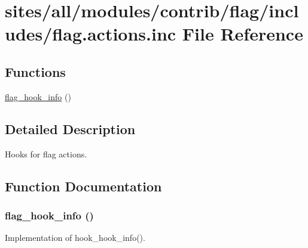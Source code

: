 \hypertarget{flag_8actions_8inc}{
\section{sites/all/modules/contrib/flag/includes/flag.actions.inc File Reference}
\label{flag_8actions_8inc}
}
\subsection*{Functions}
\begin{CompactItemize}
\item 
\hyperlink{flag_8actions_8inc_9bb185c6a656a54bf58194ad63787b58}{flag\_\-hook\_\-info} ()
\end{CompactItemize}


\subsection{Detailed Description}
Hooks for flag actions. 

\subsection{Function Documentation}
\hypertarget{flag_8actions_8inc_9bb185c6a656a54bf58194ad63787b58}{
\subsubsection[{flag\_\-hook\_\-info}]{\setlength{\rightskip}{0pt plus 5cm}flag\_\-hook\_\-info ()}}
\label{flag_8actions_8inc_9bb185c6a656a54bf58194ad63787b58}


Implementation of hook\_\-hook\_\-info(). 